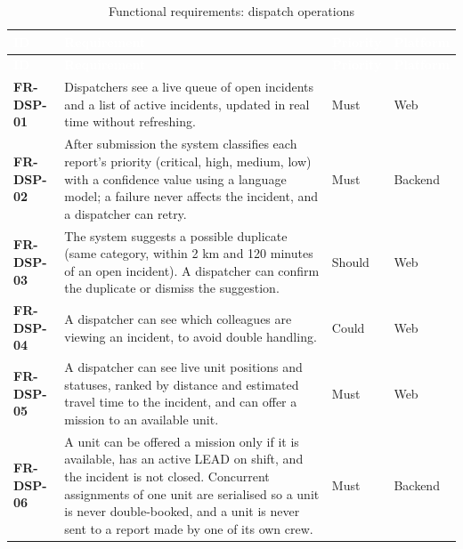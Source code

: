 {\tabfont\rowband
\begin{longtable}{@{}>{\raggedright\arraybackslash}p{}>{\raggedright\arraybackslash}p{}>{\raggedright\arraybackslash}p{}>{\raggedright\arraybackslash}p{}@{}}
\caption{Functional requirements: dispatch operations}\label{tab:fr-dsp}\\
\rowcolor{najdanavy}\textcolor{white}{\sffamily\bfseries\small ID} & \textcolor{white}{\sffamily\bfseries\small Requirement} & \textcolor{white}{\sffamily\bfseries\small Priority} & \textcolor{white}{\sffamily\bfseries\small Platform}\\
\endfirsthead
\rowcolor{najdanavy}\textcolor{white}{\sffamily\bfseries\small ID} & \textcolor{white}{\sffamily\bfseries\small Requirement} & \textcolor{white}{\sffamily\bfseries\small Priority} & \textcolor{white}{\sffamily\bfseries\small Platform}\\
\endhead
\bottomrule\endlastfoot
\textbf{FR-DSP-01} & Dispatchers see a live queue of open incidents and a list of active incidents, updated in real time without refreshing. & Must & Web\\
\textbf{FR-DSP-02} & After submission the system classifies each report’s priority (critical, high, medium, low) with a confidence value using a language model; a failure never affects the incident, and a dispatcher can retry. & Must & Backend\\
\textbf{FR-DSP-03} & The system suggests a possible duplicate (same category, within 2 km and 120 minutes of an open incident). A dispatcher can confirm the duplicate or dismiss the suggestion. & Should & Web\\
\textbf{FR-DSP-04} & A dispatcher can see which colleagues are viewing an incident, to avoid double handling. & Could & Web\\
\textbf{FR-DSP-05} & A dispatcher can see live unit positions and statuses, ranked by distance and estimated travel time to the incident, and can offer a mission to an available unit. & Must & Web\\
\textbf{FR-DSP-06} & A unit can be offered a mission only if it is available, has an active LEAD on shift, and the incident is not closed. Concurrent assignments of one unit are serialised so a unit is never double-booked, and a unit is never sent to a report made by one of its own crew. & Must & Backend\\

\end{longtable}}
